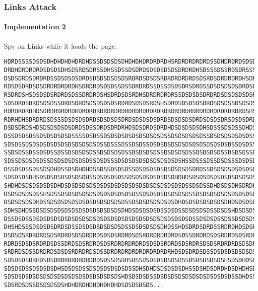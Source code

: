 \documentclass{beamer}
\begin{document}
\begin{frame}[fragile]
    \frametitle{Links Attack}
    \framesubtitle{Implementation 2}

    Spy on Links while it loads the page.


\begingroup
\fontsize{7pt}{7pt}\selectfont
\begin{verbatim}
HDRDSSSSDSDSDHDHDHDHDRDHDSSDSDSDSDHDHDHDRDRDRDHSRDRDRDRDRDSSDHDRDRDSDSDRDRDRDHDH
DRDHDRDRDRDSDSDSDHSDSRDSDRSSDHSSDSSDSDRDSDSDSDSDSDRDRDHSDSSSDSSRDSDRSSSDHDSDSDRS
DSDSDRDSDRDRDSSDSDSDSDRDSDSDSDSDSDSRDRDSDSDSRDRDRDRDRDSDSRDSDRDRDRDHSDRDRDRDRDRD
RDSDSDRDSDSDRDRDRDRDHSDRDRDSDSDSSDSSDRDRDSSDSSDSDSDRSDRDSSDSDSDSDSDRDSDRDSDSDSDS
RSDRDSHSDSDSDSRDRDSDSSDRDRDSHSDRDSDSRDHSDRDRDRDRSSDSDSDSDRDRDSDSDSDSDSRSRDHSSDSD
SDSDRDSDRDSDSDSSDRDSDRDSDSDSDSDSRDRDSDSDSRDSHSDRDSDSDSDSDRDSDSDSSDSDSDSSDSDSDRDS
RDRDRDRDHDSDRDRDRDRDHDRDRDRDRDRDRDRDRDRDRDRDRDRDRDRDRDRDRDRDRDRDRDRDSHSDRDSDRDHD
RDRHDHSDRDRDSDSSSDSDSDSDRDSDSDSDSDRDSDSDSDSDRDSDSDSDSDRDSDSDSDRSDSDSDRDHDHDSDSDS
DSDSDRDSHDSDSDSDSDSDRDSDSSDRDSDRDRHDSDSDRDSDRDHDSDSDSDSDHSDSSSDSDSSDHDSSSDSDHDHS
DSSDSDSDSSDSDSDSDSDSSSSDSDSSDSDSDSDSDSDSDSDSDSSDSDSDSDSDSSDSDSDSDSDSDSSDSDSDSDSD
SDSDSSDSDSDSDSDSDSDSDSDSDSDSSDSSSDSSDSDSSDSDSDSDSDSDSDSDSDSDSDSDSSDSDSSDSDSDSDSD
SSDSDSSDSSDSDSSDSSDSDSDSDSSDSDSDSDSSDSDSDSDSSDSDSDSDSSDSDSDSDSSDSDSDSSDSDSDSDSDS
SDSSDSDSDSDSSDSDSDSDSDSDSSDSDSSSDSDSDSDSDSDSDSDSDSHSSDSSSDSSDSDSSSDSDSDSDSDSDSDS
DSSDSDSSDSSDSDHDSSDSDHDHDSSDSSDSDSDSSDSDSDSDSDSDSDSDSDRDSSDSDSDSDSDSDSDSDSDSDHSD
SDSDSDSDHSDSDSDSHSDSDSDHSSDSDSDSDSSDSDSDSDSDSDSDHDHDSDSDSDSDSDSDSDSDSDSDSDSDSDSD
SHDHDSDSDSDSDSDHDSDSDSDSDSDSDSDSDSDSDSDSDSDSDSDSDSDSSDSDSSDHDSDSDHSDRDHDSDSDSSDS
DSDSDSDSDSSHSDSSDSDSDSDSDSDSDSDSDSDSDSSDSDSDSDSDSDSDSSDSDSDSDSDSDSDSDSDSDSDHDSDS
DSDSDSDSDHDSSDSDSDSDSDSDSDSDSDSDSDSSDSDSDSDSDSDSDHDSDSDSDSDSDSDHDSDSDSDSDSDSDSDS
SDHSDHDSSDSDSDSDSDSDSDSDSDSDSDSDSDHDSDSDSDSDSSDSDSSDSDSDSDSSDSDSHDSDSDSDSDSDSSDS
DSSDSDSSDSDSDSDSDSDSDSDSDSDSDSDSDSDSDSDSDSDSDSDSDSDSDSSDSDSDSSDSSDSDSDSDSDSDHSDS
DHSHDSSSDSDSDSDRDSDSSDSDSDSDSDSDSDSSDSDSDSDSDHDSSHDSDRDSDRDSSRDRDHDSDSRDRDRDSSDR
DSDSDSRDRDRDSDSRDRDSDSDRDRDSDSDSRDRDSDSRDRDRDRDRDSDSSDRDRDSDSRDRDSDSRDRDRDSDSDSD
RDRDSDSDSRDRDSDSSDRDSDSRDRDSDSRDRDRDRDRDSDSDSRDRDSDSRDRSDSDSRDRDRDSDSDRDRDRDSDSD
SRDRDSDSSDRDRDSDSDSRDRDRDSDSSDRDRDRDRDRDRDRDRDRHDSDSDRDSDSSDSDSDSDSDSDSDSDRDSDSD
SDSDSDSDRHDSDSDRDRDRDRDRDRDSDSSDSDHSDSSDSDSDSDSDSDSSDSDSDSDSDSHSDSDHDSDSDSSDSDHD
SDSDSDSSDSDSDSDHSDSDSDSSDSDSDSDSDSDSSDHSDHDSDSDSDSDHSSDSHDSDRDHDSDHDHSDSDSDHDSDS
SDSDSDSDSDSDSDSDSDSDSDSDSDSDSDSDSHDSDSDSDSSDSDSDSDSDSDSDSDSDSDSDSSDHDSSDSDSDSDSD
SDSRDSDSSDSDSDSDSHDHDRDHDHDHDHDHDSDSDSDSDS...
\end{verbatim}
\endgroup

\end{frame}
\end{document}
